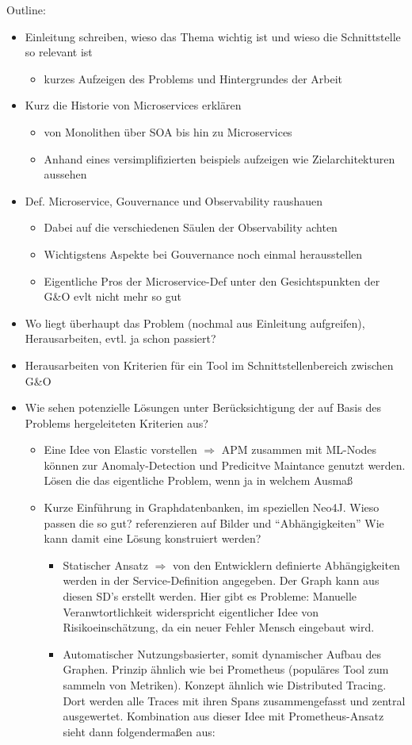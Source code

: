 \documentclass[
	12pt,
	BCOR=5mm,
	DIV=12,
	headinclude=on,
	footinclude=off,
	parskip=half,
	bibliography=totoc,
	listof=entryprefix,
	toc=listof,
	numbers=noenddot,
	plainfootsepline
]{scrreprt}
\begin{document}
Outline:
\begin{itemize}
	\item Einleitung schreiben, wieso das Thema wichtig ist und wieso die Schnittstelle so relevant ist
	\begin{itemize}
		\item kurzes Aufzeigen des Problems und Hintergrundes der Arbeit
	\end{itemize}
	\item Kurz die Historie von Microservices erklären
	\begin{itemize}
		\item von Monolithen über SOA bis hin zu Microservices
		\item Anhand eines versimplifizierten beispiels aufzeigen wie Zielarchitekturen aussehen
	\end{itemize}
	\item Def. Microservice, Gouvernance und Observability raushauen
	\begin{itemize}
		\item Dabei auf die verschiedenen Säulen der Observability achten
		\item Wichtigstens Aspekte bei Gouvernance noch einmal herausstellen
		\item Eigentliche Pros der Microservice-Def unter den Gesichtspunkten der G\&O evlt nicht mehr so gut
	\end{itemize}
	\item Wo liegt überhaupt das Problem (nochmal aus Einleitung aufgreifen), Herausarbeiten, evtl. ja schon passiert?
	\item Herausarbeiten von Kriterien für ein Tool im Schnittstellenbereich zwischen G\&O
	\item Wie sehen potenzielle Lösungen unter Berücksichtigung der auf Basis des Problems hergeleiteten Kriterien aus?
	\begin{itemize}
		\item Eine Idee von Elastic vorstellen $\Rightarrow$ APM zusammen mit ML-Nodes können zur Anomaly-Detection und Predicitve Maintance genutzt werden. Lösen die das eigentliche Problem, wenn ja in welchem Ausmaß
		\item Kurze Einführung in Graphdatenbanken, im speziellen Neo4J. Wieso passen die so gut? referenzieren auf Bilder und \enquote{Abhängigkeiten} Wie kann damit eine Lösung konstruiert werden?
		\begin{itemize}
			\item Statischer Ansatz $\Rightarrow$ von den Entwicklern definierte Abhängigkeiten werden in der Service-Definition angegeben. Der Graph kann aus diesen SD's erstellt werden. Hier gibt es Probleme: Manuelle Veranwtortlichkeit widerspricht eigentlicher Idee von Risikoeinschätzung, da ein neuer Fehler Mensch eingebaut wird.
			\item Automatischer Nutzungsbasierter, somit dynamischer Aufbau des Graphen. Prinzip ähnlich wie bei Prometheus (populäres Tool zum sammeln von Metriken). Konzept ähnlich wie Distributed Tracing. Dort werden alle Traces mit ihren Spans zusammengefasst und zentral ausgewertet. Kombination aus dieser Idee mit Prometheus-Ansatz sieht dann folgendermaßen aus:
			

\end{itemize}
\end{itemize}
\end{itemize}
\end{document}

